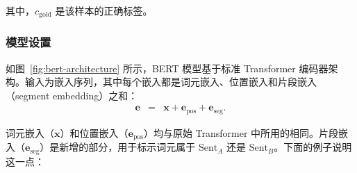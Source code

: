 \noindent 其中，$c_{\mathrm{gold}}$ 是该样本的正确标签。

\subsubsection{模型设置}

\noindent 如图~\ref{fig:bert-architecture} 所示，BERT 模型基于标准 Transformer 编码器架构。输入为嵌入序列，其中每个嵌入都是词元嵌入、位置嵌入和片段嵌入（segment embedding）之和：
\begin{eqnarray}
\mathbf{e} & = & \mathbf{x} + \mathbf{e}_{\mathrm{pos}} + \mathbf{e}_{\mathrm{seg}}.
\end{eqnarray}

\noindent 词元嵌入（$\mathbf{x}$）和位置嵌入（$\mathbf{e}_{\mathrm{pos}}$）均与原始 Transformer 中所用的相同。片段嵌入（$\mathbf{e}_{\mathrm{seg}}$）是新增的部分，用于标示词元属于 $\mathrm{Sent}_{A}$ 还是 $\mathrm{Sent}_{B}$。下面的例子说明这一点：

\vspace{0.5em}
\begin{center}
\begingroup
\renewcommand{\arraystretch}{1.2}
\setlength{\tabcolsep}{2pt}
{\small
{}
}
\endgroup
\end{center}
\vspace{0.5em}

